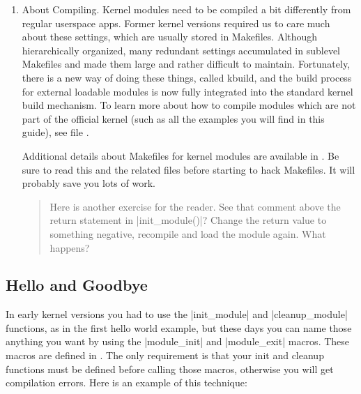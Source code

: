 \documentclass[10pt, oneside]{book}
\begin{document}
\begin{enumerate}
        For development, \cpp|pr_debug()| is particularly useful.
        When the kernel is compiled with \cpp|CONFIG_DYNAMIC_DEBUG|, \cpp|pr_debug()| calls are compiled in but disabled by default.
        You can selectively enable them at runtime without recompiling or reloading the module by writing to \verb|/sys/kernel/debug/dynamic_debug/control|:
        \begin{codebash}
echo "module mymodule +p" > /sys/kernel/debug/dynamic_debug/control
        \end{codebash}
        The \verb|+p| flag activates printing; \verb|-p| disables it.
        You can filter by file, function, or line number.
        See  for the full syntax.

  \item About Compiling.
        Kernel modules need to be compiled a bit differently from regular userspace apps.
        Former kernel versions required us to care much about these settings, which are usually stored in Makefiles.
        Although hierarchically organized, many redundant settings accumulated in sublevel Makefiles and made them large and rather difficult to maintain.
        Fortunately, there is a new way of doing these things, called kbuild, and the build process for external loadable modules is now fully integrated into the standard kernel build mechanism.
        To learn more about how to compile modules which are not part of the official kernel (such as all the examples you will find in this guide), see file .

        Additional details about Makefiles for kernel modules are available in .
        Be sure to read this and the related files before starting to hack Makefiles. It will probably save you lots of work.

\begin{quote}
Here is another exercise for the reader.
See that comment above the return statement in \cpp|init_module()|?
Change the return value to something negative, recompile and load the module again.
What happens?
\end{quote}
\end{enumerate}

\subsection{Hello and Goodbye}
\label{sec:hello_n_goodbye}
In early kernel versions you had to use the \cpp|init_module| and \cpp|cleanup_module| functions, as in the first hello world example,
but these days you can name those anything you want by using the \cpp|module_init| and \cpp|module_exit| macros.
These macros are defined in .
The only requirement is that your init and cleanup functions must be defined before calling those macros, otherwise you will get compilation errors.
Here is an example of this technique:
\end{document}
